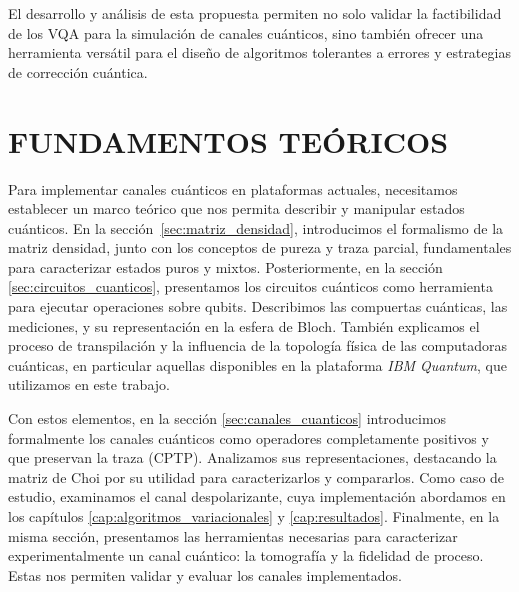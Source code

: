 \documentclass[letterpaper,12pt]{thesisECFM}
\theoremstyle{plain}
\theoremstyle{definition}
\theoremstyle{definition}
\theoremstyle{remark}
\newcommand{\1}{\mathbb{1}}
\begin{document}
El desarrollo y análisis de esta propuesta permiten no solo validar la
factibilidad de los VQA para la simulación de canales cuánticos, sino también
ofrecer una herramienta versátil para el diseño de algoritmos tolerantes a
errores y estrategias de corrección cuántica.  





\mainmatter %
\chapter{FUNDAMENTOS TEÓRICOS} \label{cap:fundamentos:teoricos} %
Para implementar canales cuánticos en plataformas actuales, necesitamos establecer un marco teórico que nos permita describir y manipular estados
cuánticos. En la sección~\ref{sec:matriz_densidad}, introducimos el formalismo
de la matriz densidad, junto con los conceptos de pureza y traza parcial,
fundamentales para caracterizar estados puros y mixtos. Posteriormente, en la
sección \ref{sec:circuitos_cuanticos}, presentamos los circuitos cuánticos
como herramienta para ejecutar operaciones sobre qubits. Describimos las
compuertas cuánticas, las mediciones, y su representación en la esfera de
Bloch. También explicamos el proceso de transpilación y la influencia de la
topología física de las computadoras cuánticas, en particular aquellas
disponibles en la  plataforma \textit{IBM Quantum}, que utilizamos
en este trabajo. 

Con estos elementos, en la sección \ref{sec:canales_cuanticos} introducimos
formalmente los canales cuánticos como operadores completamente positivos y que
preservan la traza (CPTP). Analizamos sus representaciones, destacando la
matriz de Choi por su utilidad para caracterizarlos y compararlos. Como caso de
estudio, examinamos el canal despolarizante, cuya implementación abordamos en
los capítulos \ref{cap:algoritmos_variacionales} y \ref{cap:resultados}.
Finalmente, en la misma sección, presentamos las herramientas necesarias para
caracterizar experimentalmente un canal cuántico: la tomografía y la fidelidad
de proceso. Estas nos permiten validar y evaluar los canales implementados.
\end{document}
